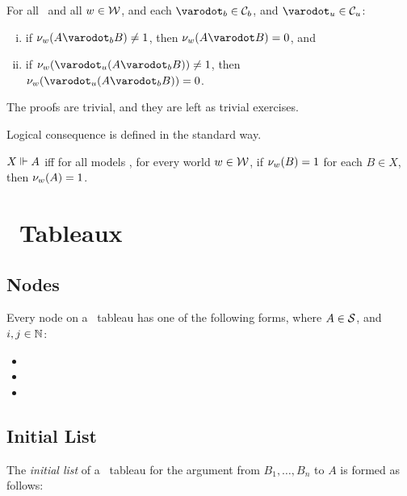 \begin{lem}\label{binaryLemma}
	For all \Model\ and all $w \in \mathcal{W}$, and each $ \varodot_b \in \BinaryConnectives$, and $ \varodot_u \in \UnaryConnectives$:
	\begin{enumerate}[(i)]
		\item if $\Valw{ w }{ A \varodot_b B } \neq 1 $, then $ \Valw{ w }{ A \varodot B } = 0 $, and
		\item if $\Valw{ w }{ \varodot_u (A \varodot_b B) } \neq 1 $, then $ \Valw{ w }{ \varodot_u (A \varodot_b B) } = 0 $.
	\end{enumerate}
\end{lem}

\noindent The proofs are trivial, and they are left as trivial exercises.

Logical consequence is defined in the standard way.

\begin{definition}\label{implDefT}
$ { X }\Vdash{ A } $ iff for all models \Model, for every world $ w \in \mathcal{W} $, if $ \mathcal{\nu}_{ w }({ B }) = 1 $ for each $ B \in X $, then $ \mathcal{\nu}_{ w }({ A }) = 1 $.
\end{definition}

\section{\GoModal\ Tableaux}\label{tableaux}

\subsection{Nodes}
Every node on a \GoModal\ tableau has one of the following forms, where $ A \in \mathcal{S}$, and $ i,j \in \mathbb{N} $:
\begin{singlespace}
\begin{itemize}
\item {}
\item {}
\item {}
\end{itemize}
\end{singlespace}
\subsection{Initial List}

\noindent The \emph{initial list} of a \GoModal\ tableau for the argument from $ B_1, \dots ,B_n $ to $ A $ is formed as follows:

